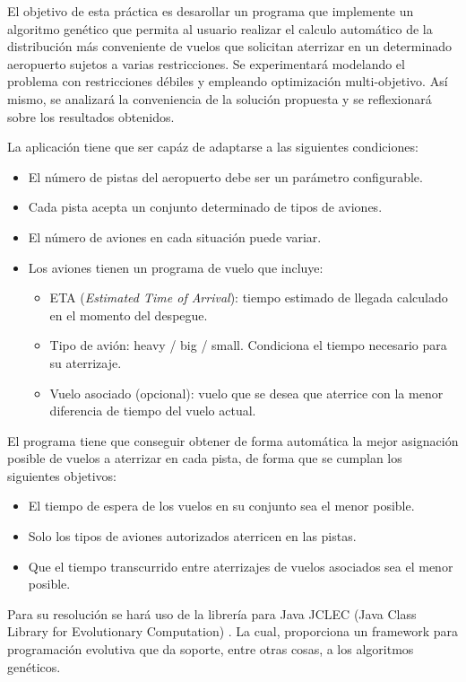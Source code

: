 \documentclass[a4paper,12pt,titlepage]{article}
\begin{document}
El objetivo de esta práctica es desarollar un programa que implemente un algoritmo genético que permita al usuario realizar el calculo automático de la distribución
más conveniente de vuelos que solicitan aterrizar en un determinado aeropuerto sujetos a varias restricciones. Se experimentará modelando el problema con restricciones débiles y empleando optimización multi-objetivo. Así mismo, se analizará la conveniencia de la solución propuesta y se reflexionará sobre los resultados obtenidos.

La aplicación tiene que ser capáz de adaptarse a las siguientes condiciones:

\begin{itemize}[noitemsep]
	\item El número de pistas del aeropuerto debe ser un parámetro configurable.
	\item Cada pista acepta un conjunto determinado de tipos de aviones.	
	\item El número de aviones en cada situación puede variar.
	\item Los aviones tienen un programa de vuelo que incluye:
	\begin{itemize}[noitemsep]
		\item ETA (\textit{Estimated Time of Arrival}): tiempo estimado de llegada calculado en el momento del despegue.
		\item Tipo de avión: heavy / big / small. Condiciona el tiempo necesario para su aterrizaje.
	  \item Vuelo asociado (opcional): vuelo que se desea que aterrice con la menor diferencia de tiempo del vuelo actual.
	\end{itemize}
\end{itemize}

El programa tiene que conseguir obtener de forma automática la mejor asignación posible de vuelos a aterrizar en cada pista, de forma que se cumplan los siguientes objetivos:

\begin{itemize}[noitemsep]
	\item El tiempo de espera de los vuelos en su conjunto sea el menor posible.
	\item Solo los tipos de aviones autorizados aterricen en las pistas.
	\item Que el tiempo transcurrido entre aterrizajes de vuelos asociados sea el menor posible. 
\end{itemize}

Para su resolución se hará uso de la librería para Java JCLEC (Java Class Library for Evolutionary Computation) \citep{web:jclec}. La cual, proporciona un framework para programación evolutiva que da soporte, entre otras cosas, a los algoritmos genéticos.
\end{document}
